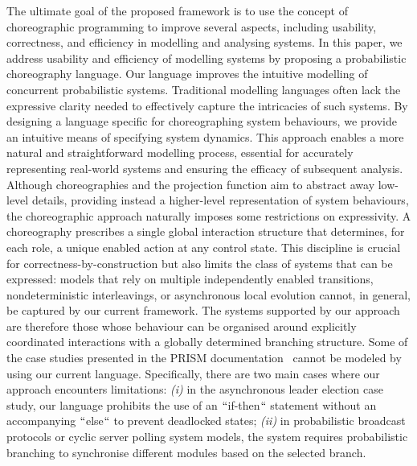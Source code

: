 The ultimate goal of the proposed framework is to use the concept of
choreographic programming to improve several aspects, including
usability, correctness, and efficiency in modelling and analysing
systems.
%
In this paper, we address usability and efficiency of modelling
systems by proposing a probabilistic choreography language.
Our language improves the intuitive modelling of concurrent
probabilistic systems. Traditional modelling languages often lack the
expressive clarity needed to effectively capture the intricacies of
such systems. By designing a language specific for choreographing
system behaviours, we provide an intuitive means of specifying system
dynamics. This approach enables a more natural and straightforward
modelling process, essential for accurately representing real-world
systems and ensuring the efficacy of subsequent analysis.
%
Although choreographies and the projection function aim to abstract
away low-level details, providing instead a higher-level
representation of system behaviours, the choreographic approach
naturally imposes some restrictions on expressivity.  {A choreography
  prescribes a single global interaction structure that determines,
  for each role, a unique enabled action at any control state.  This
  discipline is crucial for correctness-by-construction but also
  limits the class of systems that can be expressed: models that rely
  on multiple independently enabled transitions, nondeterministic
  interleavings, or asynchronous local evolution cannot, in general,
  be captured by our current framework.  The systems supported by our
  approach are therefore those whose behaviour can be organised around
  explicitly coordinated interactions with a globally determined
  branching structure.}  Some of the case studies presented in the
PRISM documentation~\cite{PRISMdoc} cannot be modeled by using our
current language. Specifically, there are two main cases where our
approach encounters limitations:
%
\textit{(i)} in the asynchronous leader election case study, our
language prohibits the use of an $\lq\lq$if-then$\lq\lq$ statement without an
accompanying $\lq\lq$else$\lq\lq$ to prevent deadlocked states;
%
\textit{(ii)} in probabilistic broadcast protocols or cyclic server
polling system models, the system requires probabilistic branching to
synchronise different modules based on the selected branch.
%
